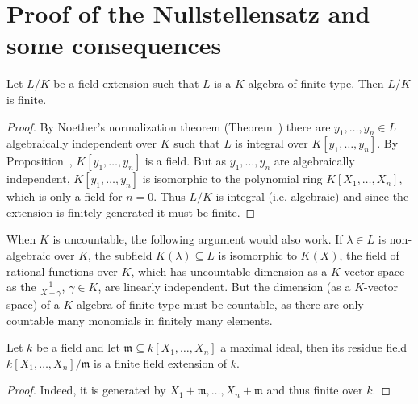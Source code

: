 \documentclass[a4paper,parskip=half,numbers=enddot, DIV=12]{scrreprt}
\begin{document}
	
	\section{Proof of the Nullstellensatz and some consequences}
	\begin{thm}
		Let $L/K$ be a field extension such that $L$ is a $K$-algebra of finite type. Then $L/K$ is finite.
	\end{thm}
	\begin{proof}
		By Noether's normalization theorem (Theorem~)  there are $y_1, \ldots, y_n\in L$ algebraically independent over $K$ such that $L$ is integral over $K[y_1,\ldots,y_n]$. By Proposition~, $K[y_1,\ldots,y_n]$ is a field. But as $y_1,\ldots, y_n$ are algebraically independent, $K[y_1,\ldots, y_n]$ is isomorphic to the polynomial ring $K[X_1,\ldots,X_n]$, which is only a field for $n=0$. Thus $L/K$ is integral (i.e. algebraic) and since the extension is finitely generated it must be finite. 
	\end{proof}
	\begin{rem}
		When $K$ is uncountable, the following argument would also work. If $\lambda\in L$ is non-algebraic over $K$, the subfield $K(\lambda)\subseteq L$ is isomorphic to $K(X)$, the field of rational functions over $K$, which has uncountable dimension as a $K$-vector space as the $\frac{1}{X-\gamma}$, $\gamma\in K$, are linearly independent. But the dimension (as a $K$-vector space) of a $K$-algebra of finite type must be countable, as there are only countable many monomials in finitely many elements.
	\end{rem}
	\begin{cor}
		Let $k$ be a field and let $\mathfrak{m}\subseteq k[X_1,\ldots,X_n]$ a maximal ideal, then its residue field $k[X_1,\ldots,X_n]/\mathfrak{m}$ is a finite field extension of $k$.
	\end{cor}
	\begin{proof}
		Indeed, it is generated by $X_1+\mathfrak{m},\ldots, X_n+\mathfrak{m}$ and thus finite over $k$.
	\end{proof}
	
\end{document}
